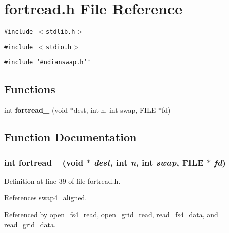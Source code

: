 \section{fortread.h File Reference}
\label{fortread_8h}
{\tt \#include $<$stdlib.h$>$}\par
{\tt \#include $<$stdio.h$>$}\par
{\tt \#include \char`\"{}endianswap.h\char`\"{}}\par
\subsection*{Functions}
\begin{CompactItemize}
\item 
int {\bf fortread\_} (void $\ast$dest, int n, int swap, FILE $\ast$fd)
\end{CompactItemize}


\subsection{Function Documentation}
\subsubsection{\setlength{\rightskip}{0pt plus 5cm}int fortread\_ (void $\ast$ {\em dest}, int {\em n}, int {\em swap}, FILE $\ast$ {\em fd})\hspace{0.3cm}{\tt  [static]}}\label{fortread_8h_a0}




Definition at line 39 of file fortread.h.

References swap4\_\-aligned.

Referenced by open\_\-fs4\_\-read, open\_\-grid\_\-read, read\_\-fs4\_\-data, and read\_\-grid\_\-data.